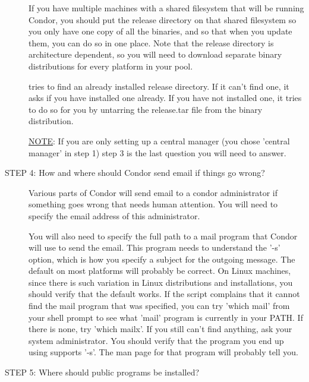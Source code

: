 \begin{description}
     If you have multiple machines with a shared filesystem that will
     be running Condor, you should put the release directory on that
     shared filesystem so you only have one copy of all the binaries,
     and so that when you update them, you can do so in one place.
     Note that the release directory is architecture dependent, so you
     will need to download separate binary distributions for every
     platform in your pool.

      tries to find an already installed release
     directory.  If it can't find one, it asks if you have installed
     one already.  If you have not installed one, it tries to do so
     for you by untarring the release.tar file from the binary
     distribution.  

\underline{NOTE}: If you are only setting up a central manager (you chose 'central
     manager' in step 1) step 3 is the last question you will need to
     answer.

\item[STEP 4: How and where should Condor send email if things go wrong?]

     Various parts of Condor will send email to a condor administrator
     if something goes wrong that needs human attention.  You will
     need to specify the email address of this administrator.  

     You will also need to specify the full path to a mail program
     that Condor will use to send the email.  This program needs to
     understand the '-s' option, which is how you specify a subject
     for the outgoing message.  The default on most platforms will
     probably be correct.  On Linux machines, since there is such
     variation in Linux distributions and installations, you should
     verify that the default works.  If the script complains that it
     cannot find the mail program that was specified, you can try
     'which mail' from your shell prompt to see what 'mail' program is
     currently in your PATH.  If there is none, try 'which mailx'.  If
     you still can't find anything, ask your system administrator.
     You should verify that the program you end up using supports
     '-s'.  The man page for that program will probably tell you.

\item[STEP 5: Where should public programs be installed?]


\end{description}
